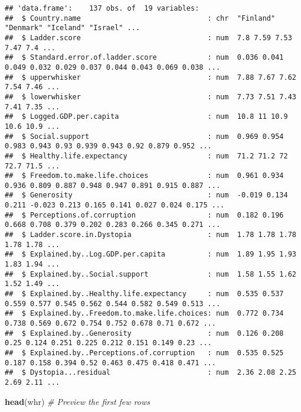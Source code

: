 \documentclass[
]{article}
\newenvironment{Shaded}{\begin{snugshade}}{\end{snugshade}}
\newcommand{\CommentTok}[1]{\textcolor[rgb]{0.56,0.35,0.01}{\textit{#1}}}
\newcommand{\FunctionTok}[1]{\textcolor[rgb]{0.13,0.29,0.53}{\textbf{#1}}}
\newcommand{\NormalTok}[1]{#1}
\begin{document}
\begin{verbatim}
## 'data.frame':    137 obs. of  19 variables:
##  $ Country.name                              : chr  "Finland" "Denmark" "Iceland" "Israel" ...
##  $ Ladder.score                              : num  7.8 7.59 7.53 7.47 7.4 ...
##  $ Standard.error.of.ladder.score            : num  0.036 0.041 0.049 0.032 0.029 0.037 0.044 0.043 0.069 0.038 ...
##  $ upperwhisker                              : num  7.88 7.67 7.62 7.54 7.46 ...
##  $ lowerwhisker                              : num  7.73 7.51 7.43 7.41 7.35 ...
##  $ Logged.GDP.per.capita                     : num  10.8 11 10.9 10.6 10.9 ...
##  $ Social.support                            : num  0.969 0.954 0.983 0.943 0.93 0.939 0.943 0.92 0.879 0.952 ...
##  $ Healthy.life.expectancy                   : num  71.2 71.2 72 72.7 71.5 ...
##  $ Freedom.to.make.life.choices              : num  0.961 0.934 0.936 0.809 0.887 0.948 0.947 0.891 0.915 0.887 ...
##  $ Generosity                                : num  -0.019 0.134 0.211 -0.023 0.213 0.165 0.141 0.027 0.024 0.175 ...
##  $ Perceptions.of.corruption                 : num  0.182 0.196 0.668 0.708 0.379 0.202 0.283 0.266 0.345 0.271 ...
##  $ Ladder.score.in.Dystopia                  : num  1.78 1.78 1.78 1.78 1.78 ...
##  $ Explained.by..Log.GDP.per.capita          : num  1.89 1.95 1.93 1.83 1.94 ...
##  $ Explained.by..Social.support              : num  1.58 1.55 1.62 1.52 1.49 ...
##  $ Explained.by..Healthy.life.expectancy     : num  0.535 0.537 0.559 0.577 0.545 0.562 0.544 0.582 0.549 0.513 ...
##  $ Explained.by..Freedom.to.make.life.choices: num  0.772 0.734 0.738 0.569 0.672 0.754 0.752 0.678 0.71 0.672 ...
##  $ Explained.by..Generosity                  : num  0.126 0.208 0.25 0.124 0.251 0.225 0.212 0.151 0.149 0.23 ...
##  $ Explained.by..Perceptions.of.corruption   : num  0.535 0.525 0.187 0.158 0.394 0.52 0.463 0.475 0.418 0.471 ...
##  $ Dystopia...residual                       : num  2.36 2.08 2.25 2.69 2.11 ...
\end{verbatim}

\begin{Shaded}
\begin{Highlighting}[]
\FunctionTok{head}\NormalTok{(whr)  }\CommentTok{\# Preview the first few rows}
\end{Highlighting}
\end{Shaded}
\end{document}
